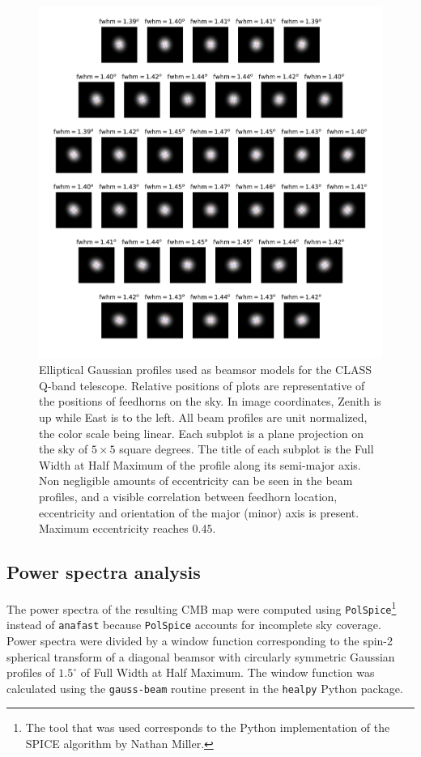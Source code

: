 \documentclass[a4paper,fleqn]{cas-dc}\sloppy
\begin{document}
	\begin{figure}
		\centering
		\includegraphics[width=1.0 \linewidth]{figures/qband_beams_main_beam_fwhm_x}
		\caption{Elliptical Gaussian profiles used as beamsor models for the CLASS Q-band telescope. Relative positions of plots are representative of the positions of feedhorns on the sky. In image coordinates, Zenith is up while East is to the left. All beam profiles are unit normalized, the color scale being linear. Each subplot is a plane projection on the sky of $5\times5$ square degrees. The title of each subplot is the Full Width at Half Maximum of the profile along its semi-major axis. Non negligible amounts of eccentricity can be seen in the beam profiles, and a visible correlation between feedhorn location, eccentricity and orientation of the major (minor) axis is present. Maximum eccentricity reaches $0.45$.}
		\label{fig::qbandbeamsmainbeamfwhmx}
	\end{figure}
	
	\subsection{Power spectra analysis}
	
	The power spectra of the resulting CMB map were computed using \texttt{PolSpice}\footnote{The tool that was used corresponds to the Python implementation of the SPICE algorithm by Nathan Miller.} instead of \texttt{anafast} because \texttt{PolSpice} accounts for incomplete sky coverage. Power spectra were divided by a window function corresponding to the spin-2 spherical transform of a diagonal beamsor with circularly symmetric Gaussian profiles of $1.5^\circ$ of Full Width at Half Maximum. The window function was calculated using the \texttt{gauss-beam} routine present in the \texttt{healpy} Python package.
	
\end{document}
